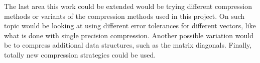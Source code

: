 The last area this work could be extended would be trying different compression methods or variants of the compression methods used in this project.
On such topic would be looking at using different error tolerances for different vectors, like what is done with single precision compression.
Another possible variation would be to compress additional data structures, such as the matrix diagonals.
Finally, totally new compression strategies could be used.

